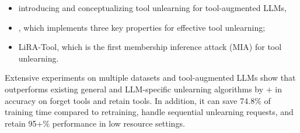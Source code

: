 \vspace{-10pt}
\begin{itemize}
\itemsep-1pt
    \item introducing and conceptualizing tool unlearning for tool-augmented LLMs,
    \item \method, which implements three key properties for effective tool unlearning;
    \item LiRA-Tool, which is the first membership inference attack (MIA) for tool unlearning.
\end{itemize}


Extensive experiments on multiple datasets and tool-augmented LLMs show that \method outperforms existing general and LLM-specific unlearning algorithms by $+$ in accuracy on forget tools and retain tools.  In addition, it can save 74.8\% of training time compared to retraining, handle sequential unlearning requests, and retain 95+\% performance in low resource settings.